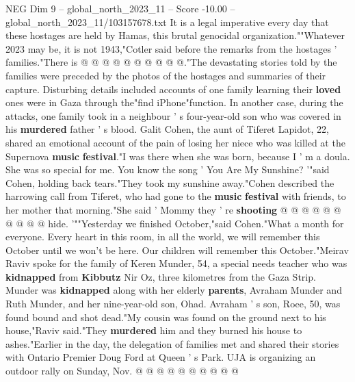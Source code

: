 \begin{textsample}{NEG Dim 9 – global\_north\_2023\_11 – Score -10.00 – global\_north\_2023\_11/103157678.txt}
It is a legal imperative every day that these hostages are held by Hamas, this brutal genocidal organization.""Whatever 2023 may be, it is not 1943,"Cotler said before the remarks from the hostages ' families."There is @ @ @ @ @ @ @ @ @ @."The devastating stories told by the families were preceded by the photos of the hostages and summaries of their capture.
Disturbing details included accounts of one family learning their \textbf{loved} ones were in Gaza through the"find iPhone"function.
In another case, during the attacks, one family took in a neighbour ' s four-year-old son who was covered in his \textbf{murdered} father ' s blood.
Galit Cohen, the aunt of Tiferet Lapidot, 22, shared an emotional account of the pain of losing her niece who was killed at the Supernova \textbf{music} \textbf{festival}."I was there when she was born, because I ' m a doula.
She was so special for me.
You know the song ' You Are My Sunshine? '"said Cohen, holding back tears."They took my sunshine away."Cohen described the harrowing call from Tiferet, who had gone to the \textbf{music} \textbf{festival} with friends, to her mother that morning."She said ' Mommy they ' re \textbf{shooting} @ @ @ @ @ @ @ @ @ @ hide. '""Yesterday we finished October,"said Cohen."What a month for everyone.
Every heart in this room, in all the world, we will remember this October until we won't be here.
Our children will remember this October."Meirav Raviv spoke for the family of Keren Munder, 54, a special needs teacher who was \textbf{kidnapped} from \textbf{Kibbutz} Nir Oz, three kilometres from the Gaza Strip.
Munder was \textbf{kidnapped} along with her elderly \textbf{parents}, Avraham Munder and Ruth Munder, and her nine-year-old son, Ohad.
Avraham ' s son, Roee, 50, was found bound and shot dead."My cousin was found on the ground next to his house,"Raviv said."They \textbf{murdered} him and they burned his house to ashes."Earlier in the day, the delegation of families met and shared their stories with Ontario Premier Doug Ford at Queen ' s Park.
UJA is organizing an outdoor rally on Sunday, Nov. @ @ @ @ @ @ @ @ @ @

\end{textsample}

